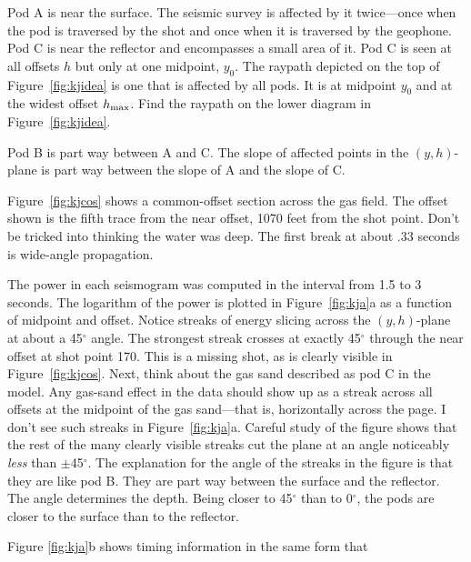 \par
Pod A is near the surface.
The seismic survey is affected by it twice---once
when the pod is traversed by the shot and once when it is
traversed by the geophone.
Pod C is near the reflector and encompasses a small area of it.
Pod C is seen at all offsets  $h$  but only at one midpoint,  $y_0$.
The raypath depicted on the top of Figure~\ref{fig:kjidea} is one that is
affected by all pods.
It is at midpoint  $y_0$  and at the widest offset  $h_{\rm max}$.
Find the raypath on the lower diagram in Figure~\ref{fig:kjidea}.
\par
Pod B is part way between A and C.
The slope of affected points in the $(y,h)$-plane is part way between
the slope of A and the slope of C.
\par
Figure~\ref{fig:kjcos} shows a common-offset section across the gas field.
The offset shown is the fifth trace from the near offset,
1070 feet from the shot point.
Don't be tricked into thinking the water was deep.
The first break at about .33 seconds is wide-angle propagation.
\par
The power in each seismogram was computed in the interval from
1.5 to 3 seconds.
The logarithm of the power is plotted in Figure~\ref{fig:kja}a as a function
of midpoint and offset.
Notice streaks of energy slicing across the  $(y,h)$-plane
at about a 45$^\circ$ angle.
The strongest streak crosses at exactly 45$^\circ$ 
through the near offset at shot point 170.
This is a missing shot, as is clearly visible in Figure~\ref{fig:kjcos}.
Next, think about the gas sand described as pod C in the model.
Any gas-sand effect in the data should show up as a streak
across all offsets at the midpoint of the gas sand---that is,
horizontally across the page.
I don't see such streaks in Figure~\ref{fig:kja}a.
Careful study of the figure shows that
the rest of the many clearly visible streaks cut the plane at
an angle noticeably
{\em  less}
than $\pm$45$^\circ$.
The explanation for the angle of the streaks in the figure 
is that they are like pod B.
They are part way between the surface and the reflector.
The angle determines the depth.
Being closer to 45$^\circ$ than to 0$^\circ$, the pods are
closer to the surface than to the reflector.
\par
Figure \ref{fig:kja}b shows timing information in the same form that
